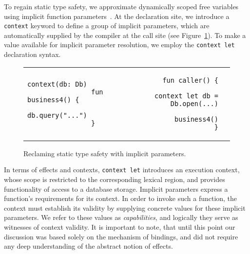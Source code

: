 \documentclass[acmsmall,review,screen]{acmart}
\begin{document}
To regain static type safety, we approximate dynamically scoped free variables using implicit function parameters~\cite{lewis2000implicit}.
At the declaration site, we introduce a \lstinline[language=colang]|context| keyword to define a group of implicit parameters, which are automatically supplied by the compiler at the call site (see Figure\ \ref{fig:implicits}).
To make a value available for implicit parameter resolution, we employ the \texttt{context let} declaration syntax.

\begin{figure}[h]
    \begin{tabular}{p{} rl}
        \begin{minipage}[t]{0.3\textwidth}
            \begin{lstlisting}[language=colang, gobble=16]
                context(db: Db)
                fun business4() {
                    db.query("...")
                }
            \end{lstlisting}
        \end{minipage}
        &
        \begin{minipage}[t]{0.5\textwidth}
            \begin{lstlisting}[language=colang, gobble=16]
                fun caller() {
                    context let db = Db.open(...)
                    business4()
                }
            \end{lstlisting}
        \end{minipage}
    \end{tabular}
    \caption{Reclaming static type safety with implicit parameters.}
    \label{fig:implicits}
\end{figure}

In terms of effects and contexts, \lstinline[language=colang]|context let| introduces an execution context, whose scope is restricted to the corresponding lexical region, and provides functionality of access to a database storage.
Implicit parameters express a function's requirements for its context.
In order to invoke such a function, the context must establish its validity by supplying concrete values for these implicit parameters.
We refer to these values as \textit{capabilities}, and logically they serve as witnesses of context validity.
It is important to note, that until this point our discussion was based solely on the mechanism of bindings, and did not require any deep understanding of the abstract notion of effects.
\end{document}

